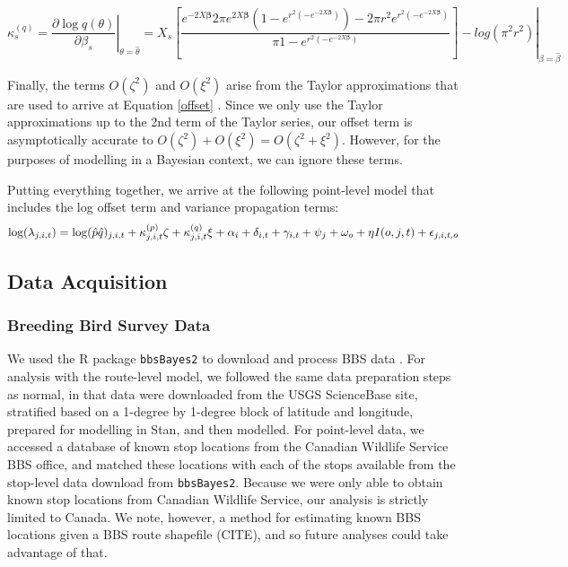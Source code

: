 \documentclass[12pt]{article}
\begin{document}
\begin{equation*}\label{kappa_q}
	\kappa_{s}^{(q)} = \left. \dfrac{\partial \log q(\theta)}{\partial \beta_s} \right\vert_{\theta = \hat{\theta}}= \left. X_s \left[\dfrac{{e^{-2X\boldsymbol{\beta}}} {2 \pi  e^{2X\boldsymbol{\beta}}} {\left(1 - e^{r^2 \left(-e^{-2X\boldsymbol{\beta}}\right)}\right)} - {2\pi r^2} {e^{r^2 \left(-e^{-2X\boldsymbol{\beta}}\right)}}}             {\pi {1-e^{r^2 \left(-e^{-2X\boldsymbol{\beta}}\right)}}}\right]  - log(\pi^2r^2) \right\vert_{\beta = \hat{\beta}}
\end{equation*}

\par Finally, the terms $O(\zeta^2)$ and $O(\xi^2)$ arise from the Taylor approximations that are used to arrive at Equation \ref{offset} \citep{bravington_variance_2021}. 
Since we only use the Taylor approximations up to the 2nd term of the Taylor series, our offset term is asymptotically accurate to $O(\zeta^2) + O(\xi^2) = O(\zeta^2 + \xi^2)$.
However, for the purposes of modelling in a Bayesian context, we can ignore these terms.

Putting everything together, we arrive at the following point-level model that includes the log offset term and variance propagation terms:
\begin{equation}\label{bbs_varprop}
	\log(\lambda_{j,i,t}) = \log(\hat{p} \hat{q})_{j,i,t} + \kappa_{j,i,t}^{(p)}\zeta + \kappa_{j,i,t}^{(q)}\xi + \alpha_i + \delta_{i,t} + \gamma_{i,t} + \psi_j + \omega_o + \eta I(o,j,t) + \epsilon_{j,i,t,o} \\
\end{equation}

\subsection{Data Acquisition}

\subsubsection{Breeding Bird Survey Data}

\par We used the R package \texttt{bbsBayes2} to download and process BBS data \citep{edwards_bbsbayes_2021}. 
For analysis with the route-level model, we followed the same data preparation steps as normal, in that data were downloaded from the USGS ScienceBase site, stratified based on a 1-degree by 1-degree block of latitude and longitude, prepared for modelling in Stan, and then modelled.
For point-level data, we accessed a database of known stop locations from the Canadian Wildlife Service BBS office, and matched these locations with each of the stops available from the stop-level data download from \texttt{bbsBayes2}.
Because we were only able to obtain known stop locations from Canadian Wildlife Service, our analysis is strictly limited to Canada.
We note, however, a method for estimating known BBS locations given a BBS route shapefile (CITE), and so future analyses could take advantage of that.
\end{document}
